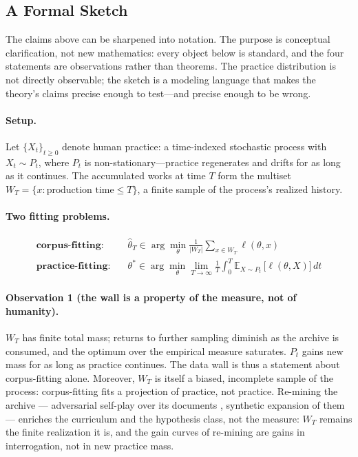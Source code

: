 \documentclass[10pt]{article}
\begin{document}
\subsection{A Formal Sketch}\label{sec:formalsketch}

The claims above can be sharpened into notation. The purpose is conceptual clarification, not new mathematics: every object below is standard, and the four statements are observations rather than theorems. The practice distribution is not directly observable; the sketch is a modeling language that makes the theory's claims precise enough to test---and precise enough to be wrong.

\paragraph{Setup.}
Let $\{X_t\}_{t \geq 0}$ denote human practice: a time-indexed stochastic process with $X_t \sim P_t$, where $P_t$ is non-stationary---practice regenerates and drifts for as long as it continues. The accumulated works at time $T$ form the multiset $W_T = \{x : \text{production time} \leq T\}$, a finite sample of the process's realized history.

\paragraph{Two fitting problems.}
\begin{align*}
\textbf{corpus-fitting:}\quad & \hat{\theta}_T \in \arg\min_\theta \frac{1}{|W_T|}\sum_{x \in W_T} \ell(\theta, x) \\[2pt]
\textbf{practice-fitting:}\quad & \theta^* \in \arg\min_\theta \lim_{T\to\infty} \frac{1}{T}\int_0^T \mathbb{E}_{X \sim P_t}\,\big[\ell(\theta, X)\big]\, dt
\end{align*}

\paragraph{Observation 1 (the wall is a property of the measure, not of humanity).}
$W_T$ has finite total mass; returns to further sampling diminish as the archive is consumed, and the optimum over the empirical measure saturates. $P_t$ gains new mass for as long as practice continues. The data wall is thus a statement about corpus-fitting alone. Moreover, $W_T$ is itself a biased, incomplete sample of the process: corpus-fitting fits a projection of practice, not practice. Re-mining the archive --- adversarial self-play over its documents \cite{liu2025spice}, synthetic expansion of them \cite{kim2026megadocs} --- enriches the curriculum and the hypothesis class, not the measure: $W_T$ remains the finite realization it is, and the gain curves of re-mining are gains in interrogation, not in new practice mass.
\end{document}
